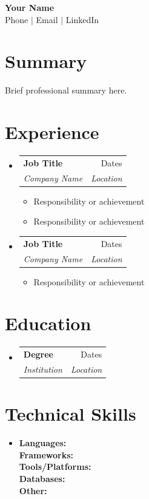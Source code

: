 \documentclass[letterpaper,11pt]{article}
\makeatletter
\newcommand{\resumeSubheading}[4]{
  \item
    \begin{tabular*}{0.97\textwidth}{l@{\extracolsep{\fill}}r}
      \textbf{#1} & #2 \\
      \textit{\small#3} & \textit{\small #4} \\
    \end{tabular*}
}
\newcommand{\resumeItem}[1]{\item {#1}}
\newcommand{\resumeSubHeadingListStart}{\begin{itemize}[leftmargin=0.15in, label={}]}
\newcommand{\resumeSubHeadingListEnd}{\end{itemize}}
\newcommand{\resumeItemListStart}{\begin{itemize}}
\newcommand{\resumeItemListEnd}{\end{itemize}}
\makeatother
\begin{document}
\begin{center}
    \textbf{\LARGE Your Name} \\
    \small Phone $|$ Email $|$ LinkedIn
\end{center}

\section{Summary}
Brief professional summary here.

\section{Experience}
\resumeSubHeadingListStart

\resumeSubheading
  {Job Title}{Dates}
  {Company Name}{Location}
  \resumeItemListStart
    \resumeItem{Responsibility or achievement}
    \resumeItem{Responsibility or achievement}
  \resumeItemListEnd

\resumeSubheading
  {Job Title}{Dates}
  {Company Name}{Location}
  \resumeItemListStart
    \resumeItem{Responsibility or achievement}
  \resumeItemListEnd

\resumeSubHeadingListEnd

\section{Education}
\resumeSubHeadingListStart

\resumeSubheading
  {Degree}{Dates}
  {Institution}{Location}

\resumeSubHeadingListEnd

\section{Technical Skills}
\begin{itemize}[leftmargin=0.15in, label={}]
  \item{
    \textbf{Languages:} \\
    \textbf{Frameworks:} \\
    \textbf{Tools/Platforms:} \\
    \textbf{Databases:} \\
    \textbf{Other:}
  }
\end{itemize}
\end{document}
